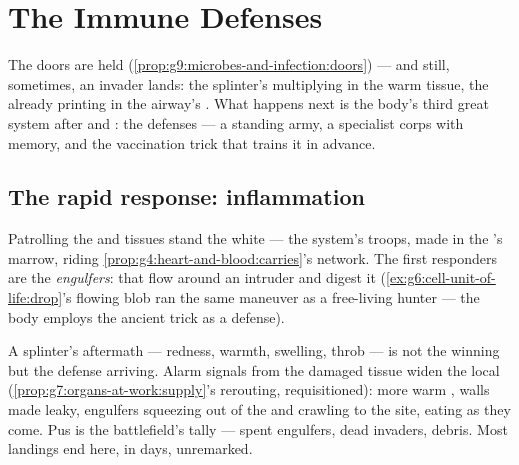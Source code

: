 \chapter{The Immune Defenses}\label{ch:g9:immune-defenses}

The doors are held (\cref{prop:g9:microbes-and-infection:doors})
--- and still, sometimes, an invader lands: the splinter's
 multiplying in the warm tissue, the  already
printing in the airway's . What happens next is the
body's third great system after  and : the
 defenses --- a standing army, a specialist corps
with memory, and the vaccination trick that trains it in
advance.

\section{The rapid response: inflammation}

\begin{definition}\label{def:g9:immune-defenses:standing}
Patrolling the  and tissues stand the white 
 --- the  system's
troops, made in the 's marrow, riding
\cref{prop:g4:heart-and-blood:carries}'s network. The
first responders are the \emph{engulfers}:  that
flow around an intruder and digest it
(\cref{ex:g6:cell-unit-of-life:drop}'s flowing blob ran
the same maneuver as a free-living hunter --- the body
employs the ancient trick as a defense).
\end{definition}

\begin{proposition}\label{prop:g9:immune-defenses:inflammation}
A splinter's aftermath --- redness, warmth, swelling,
throb --- is not the  winning but the defense
arriving. Alarm signals from the damaged tissue widen the
local  (\cref{prop:g7:organs-at-work:supply}'s
rerouting, requisitioned): more warm , walls made
leaky, engulfers squeezing out of the  and
crawling to the site, eating  as they come. Pus
is the battlefield's tally --- spent engulfers, dead
invaders, debris. Most landings end here, in days,
unremarked.
\end{proposition}
\admitted


